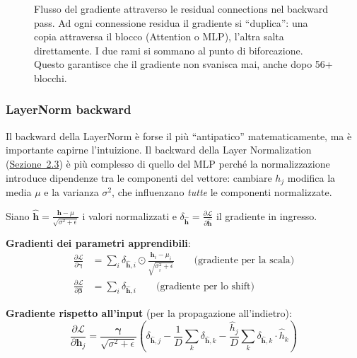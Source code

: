 \documentclass[12pt,a4paper]{article}
\begin{document}
\begin{figure}[H]
\caption{Flusso del gradiente attraverso le residual connections nel backward pass. Ad ogni connessione residua il gradiente si ``duplica'': una copia attraversa il blocco (Attention o MLP), l'altra salta direttamente. I due rami si sommano al punto di biforcazione. Questo garantisce che il gradiente non svanisca mai, anche dopo 56+ blocchi.}
\label{fig:gradient_flow_residual}
\end{figure}

\subsubsection{LayerNorm backward} \label{sec:ln_backward}

Il backward della LayerNorm \`e forse il pi\`u ``antipatico'' matematicamente, ma \`e importante capirne l'intuizione. Il backward della Layer Normalization (\hyperref[sec:layernorm]{Sezione~2.3}) \`e pi\`u complesso di quello del MLP perch\'e la normalizzazione introduce dipendenze tra le componenti del vettore: cambiare $h_j$ modifica la media $\mu$ e la varianza $\sigma^2$, che influenzano \emph{tutte} le componenti normalizzate.

\begin{formulabox}
Siano $\hat{\mathbf{h}} = \frac{\mathbf{h} - \mu}{\sqrt{\sigma^2 + \epsilon}}$ i valori normalizzati e $\delta_{\hat{\mathbf{h}}} = \frac{\partial \mathcal{L}}{\partial \hat{\mathbf{h}}}$ il gradiente in ingresso.

\textbf{Gradienti dei parametri apprendibili}:
\begin{align*}
    \frac{\partial \mathcal{L}}{\partial \boldsymbol{\gamma}} &= \sum_{i} \delta_{\hat{\mathbf{h}},i} \odot \frac{\mathbf{h}_i - \mu_i}{\sqrt{\sigma_i^2 + \epsilon}} \qquad \text{(gradiente per la scala)} \\
    \frac{\partial \mathcal{L}}{\partial \boldsymbol{\beta}} &= \sum_i \delta_{\hat{\mathbf{h}},i} \qquad \text{(gradiente per lo shift)}
\end{align*}

\textbf{Gradiente rispetto all'input} (per la propagazione all'indietro):
\[
    \frac{\partial \mathcal{L}}{\partial \mathbf{h}_j} = \frac{\boldsymbol{\gamma}}{\sqrt{\sigma^2 + \epsilon}} \left(\delta_{\hat{\mathbf{h}},j} - \frac{1}{D}\sum_{k} \delta_{\hat{\mathbf{h}},k} - \frac{\hat{h}_j}{D}\sum_{k} \delta_{\hat{\mathbf{h}},k} \cdot \hat{h}_k\right)
\]
\end{formulabox}
\end{document}
